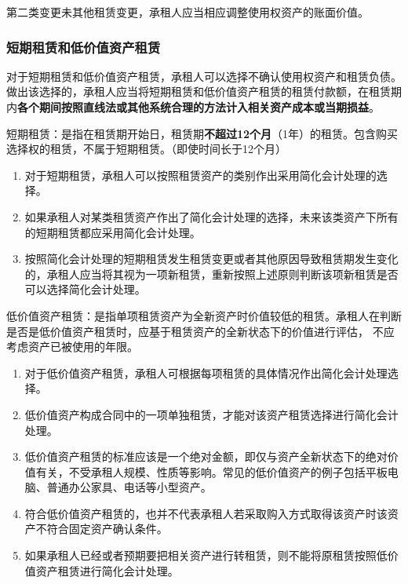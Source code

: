 \documentclass[UTF8,12pt]{ctexart}
\numberwithin{equation}{section} %
\numberwithin{figure}{section}
\numberwithin{table}{section}
\begin{document}
	第二类变更未其他租赁变更，承租人应当相应调整使用权资产的账面价值。
	
	
	\subsubsection{短期租赁和低价值资产租赁}
	对于短期租赁和低价值资产租赁，承租人可以选择不确认使用权资产和租赁负债。做出该选择的，承租人应当将短期租赁和低价值资产租赁的租赁付款额，在租赁期内\textbf{各个期间按照直线法或其他系统合理的方法计入相关资产成本或当期损益}。
	
	短期租赁：是指在租赁期开始日，租赁期\textbf{不超过12个月}（1年）的租赁。包含购买选择权的租赁，不属于短期租赁。（即使时间长于12个月）
	\begin{enumerate}
		\item 对于短期租赁，承租人可以按照租赁资产的类别作出采用简化会计处理的选择。
		
		\item 如果承租人对某类租赁资产作出了简化会计处理的选择，未来该类资产下所有的短期租赁都应采用简化会计处理。
		
		\item 按照简化会计处理的短期租赁发生租赁变更或者其他原因导致租赁期发生变化的，承租人应当将其视为一项新租赁，重新按照上述原则判断该项新租赁是否可以选择简化会计处理。
		
	\end{enumerate}
	
	低价值资产租赁：是指单项租赁资产为全新资产时价值较低的租赁。承租人在判断是否是低价值资产租赁时，应基于租赁资产的全新状态下的价值进行评估， 不应考虑资产已被使用的年限。
	\begin{enumerate}
		\item 对于低价值资产租赁，承租人可根据每项租赁的具体情况作出简化会计处理选择。
		
		\item 低价值资产构成合同中的一项单独租赁，才能对该资产租赁选择进行简化会计处理。
		
		\item 低价值资产租赁的标准应该是一个绝对金额，即仅与资产全新状态下的绝对价值有关，不受承租人规模、性质等影响。常见的低价值资产的例子包括平板电脑、普通办公家具、电话等小型资产。
		
		\item 符合低价值资产租赁的，也并不代表承租人若采取购入方式取得该资产时该资产不符合固定资产确认条件。
		
		\item 如果承租人已经或者预期要把相关资产进行转租赁，则不能将原租赁按照低价值资产租赁进行简化会计处理。
		
	\end{enumerate}
\end{document}

